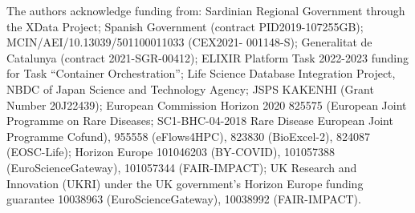 \documentclass[10pt,letterpaper]{article}
\begin{document}
The authors acknowledge funding from: 
  Sardinian Regional Government through the XData Project;
  Spanish Government (contract PID2019-107255GB);
  MCIN/AEI/10.13039/501100011033 (CEX2021- 001148-S);
  Generalitat de Catalunya (contract 2021-SGR-00412);
  ELIXIR Platform Task 2022-2023 funding for Task ``Container
  Orchestration'';
  Life Science Database Integration Project, NBDC of Japan Science and
  Technology Agency;
  JSPS KAKENHI (Grant Number 20J22439);
  European Commission Horizon 2020 
  825575 (European Joint Programme on Rare Diseases; SC1-BHC-04-2018 Rare Disease European Joint Programme Cofund),
  955558 (eFlows4HPC),
  823830
  (BioExcel-2), 
  824087
  (EOSC-Life);
  Horizon Europe 
  101046203 (BY-COVID),
  101057388 (EuroScienceGateway),
  101057344 (FAIR-IMPACT);
  UK Research and Innovation (UKRI) under the UK government's Horizon
  Europe funding guarantee 
  10038963 (EuroScienceGateway), 
  10038992 (FAIR-IMPACT).

\nolinenumbers
\end{document}
